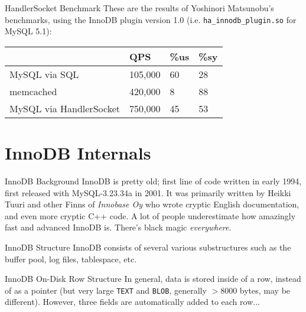 \documentclass[14pt]{beamer}
\begin{document}
\begin{frame}{HandlerSocket Benchmark}
  These are the results of Yoshinori Matsunobu's benchmarks, using the InnoDB
  plugin version 1.0 (i.e. \texttt{ha\_innodb\_plugin.so} for MySQL 5.1):
  \begin{table}[ht]
    \begin{tabular}{l l l l}
                              & QPS     & \%us & \%sy \\ \hline
      MySQL via SQL           & 105,000 & 60   & 28   \\
      memcached               & 420,000 & 8    & 88   \\
      MySQL via HandlerSocket & 750,000 & 45   & 53   \\
    \end{tabular}
  \end{table}
\end{frame}

\section{InnoDB Internals}

\begin{frame}{InnoDB Background}
  InnoDB is pretty old; first line of code written in early 1994, first released
  with MySQL-3.23.34a in 2001.
  \newline
  \newline
  It was primarily written by Heikki Tuuri and other Finns of \emph{Innobase Oy}
  who wrote cryptic English documentation, and even more cryptic C++ code.
  \newline
  \newline
  A lot of people underestimate how amazingly fast and advanced InnoDB
  is. There's black magic \emph{everywhere}.
\end{frame}

\begin{frame}{InnoDB Structure}
  InnoDB consists of several various substructures such as the buffer pool, log
  files, tablespace, etc.
\end{frame}

\begin{frame}{InnoDB On-Disk Row Structure}
  In general, data is stored inside of a row, instead of as a pointer (but very
  large \texttt{TEXT} and \texttt{BLOB}, generally $>8000$ bytes, may be
  different).
  \newline
  \newline
  However, three fields are automatically added to each row...
\end{frame}
\end{document}
